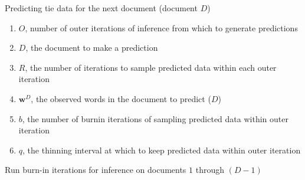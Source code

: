 \documentclass[a4paper]{article}
\begin{document}
 \begin{algorithm}[H]
	\SetAlgoLined
	\caption{Predicting tie data for the next document (document $D$)}
	\begin{enumerate}
	\item $O$, number of outer iterations of inference from which to generate predictions
	\item $D$, the document to make a prediction
	\item $R$, the number of iterations to sample predicted data within each outer iteration
	\item $\boldsymbol{w}^{D}$, the observed words in the document to predict ($D$)
	\item $b$, the number of burnin iterations of sampling predicted data within outer iteration
	\item $q$, the thinning interval at which to keep predicted data within outer iteration
	\end{enumerate}
	Run burn-in iterations for inference on documents $1$ through $(D-1)$\\
\end{algorithm}
\end{document}
